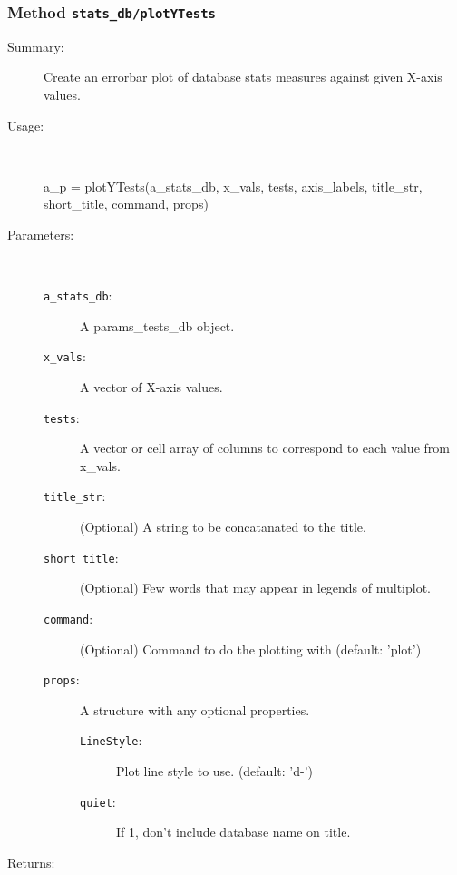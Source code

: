 \subsubsection[Method \texttt{plotYTests}]{Method \texttt{stats\_db/plotYTests}}%
%
\label{ref_stats_db__plotYTests}%
\hypertarget{ref_stats_db__plotYTests}{}%
\begin{description}
\item[Summary:]Create an errorbar plot of database stats measures against given X-axis values.
%
\item[Usage:]~%
\begin{lyxcode}%
a\_p = plotYTests(a\_stats\_db, x\_vals, tests, axis\_labels, title\_str, short\_title, command, props)
%
\end{lyxcode}%
%
%
\item[Parameters:]~
\begin{description}%
\item[\texttt{a\_stats\_db}:]
 A params\_tests\_db object.
\item[\texttt{x\_vals}:]
 A vector of X-axis values.
\item[\texttt{tests}:]
 A vector or cell array of columns to correspond to each value from x\_vals.
\item[\texttt{title\_str}:]
 (Optional) A string to be concatanated to the title.
\item[\texttt{short\_title}:]
 (Optional) Few words that may appear in legends of multiplot.
\item[\texttt{command}:]
 (Optional) Command to do the plotting with (default: 'plot')
\item[\texttt{props}:]
 A structure with any optional properties.
\begin{description}%
\item[\texttt{LineStyle}:]
 Plot line style to use. (default: 'd-')
\item[\texttt{quiet}:]
 If 1, don't include database name on title.
\end{description}%
\end{description}%
%
\item[Returns:]~


\end{description}
